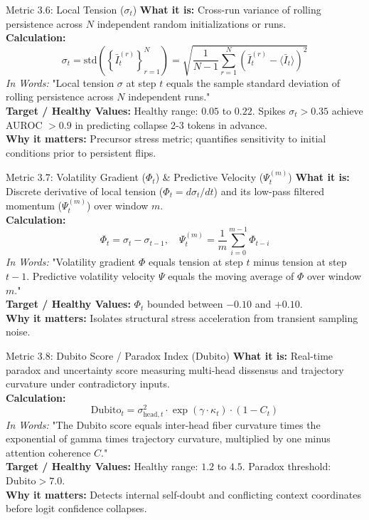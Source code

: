 \documentclass[10pt,a4paper]{article}
\begin{document}
\begin{metricbox}{Metric 3.6: Local Tension ($\sigma_t$)}
\textbf{What it is:} Cross-run variance of rolling persistence across $N$ independent random initializations or runs.\\
\textbf{Calculation:}
$$\sigma_t = \text{std}\left(\left\{\bar{I}_t^{(r)}\right\}_{r=1}^N\right) = \sqrt{\frac{1}{N-1} \sum_{r=1}^N \left(\bar{I}_t^{(r)} - \langle \bar{I}_t \rangle\right)^2}$$
\emph{In Words:} "Local tension $\sigma$ at step $t$ equals the sample standard deviation of rolling persistence across $N$ independent runs."\\
\textbf{Target / Healthy Values:} Healthy range: $0.05$ to $0.22$. Spikes $\sigma_t > 0.35$ achieve AUROC $> 0.9$ in predicting collapse 2-3 tokens in advance.\\
\textbf{Why it matters:} Precursor stress metric; quantifies sensitivity to initial conditions prior to persistent flips.
\end{metricbox}

\begin{metricbox}{Metric 3.7: Volatility Gradient ($\Phi_t$) \& Predictive Velocity ($\Psi_t^{(m)}$)}
\textbf{What it is:} Discrete derivative of local tension ($\Phi_t = d\sigma_t/dt$) and its low-pass filtered momentum ($\Psi_t^{(m)}$) over window $m$.\\
\textbf{Calculation:}
$$\Phi_t = \sigma_t - \sigma_{t-1}, \quad \Psi_t^{(m)} = \frac{1}{m} \sum_{i=0}^{m-1} \Phi_{t-i}$$
\emph{In Words:} "Volatility gradient $\Phi$ equals tension at step $t$ minus tension at step $t-1$. Predictive volatility velocity $\Psi$ equals the moving average of $\Phi$ over window $m$."\\
\textbf{Target / Healthy Values:} $\Phi_t$ bounded between $-0.10$ and $+0.10$.\\
\textbf{Why it matters:} Isolates structural stress acceleration from transient sampling noise.
\end{metricbox}

\begin{metricbox}{Metric 3.8: Dubito Score / Paradox Index ($\text{Dubito}$)}
\textbf{What it is:} Real-time paradox and uncertainty score measuring multi-head dissensus and trajectory curvature under contradictory inputs.\\
\textbf{Calculation:}
$$\text{Dubito}_t = \sigma_{\text{head}, t}^2 \cdot \exp\left(\gamma \cdot \kappa_t\right) \cdot \left(1 - C_t\right)$$
\emph{In Words:} "The Dubito score equals inter-head fiber curvature times the exponential of gamma times trajectory curvature, multiplied by one minus attention coherence $C$."\\
\textbf{Target / Healthy Values:} Healthy range: $1.2$ to $4.5$. Paradox threshold: $\text{Dubito} > 7.0$.\\
\textbf{Why it matters:} Detects internal self-doubt and conflicting context coordinates before logit confidence collapses.
\end{metricbox}
\end{document}

